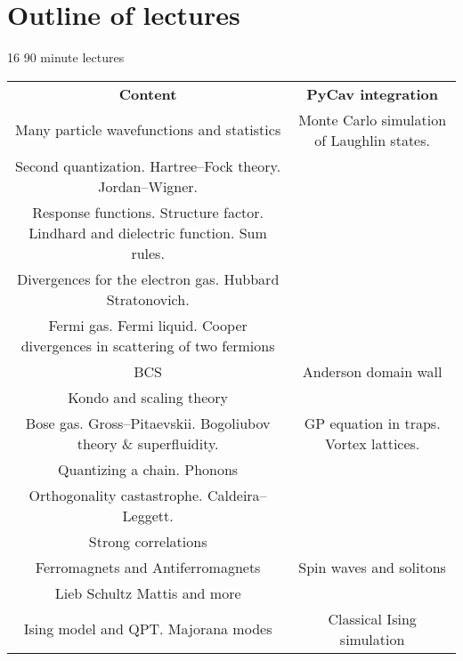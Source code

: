 \section{Outline of lectures}

16 90 minute lectures

\begin{table} 
    \begin{tabular}{ c | c }
     \textbf{Content}   & \textbf{PyCav integration}  \\ 
       Many particle wavefunctions and statistics 
   & Monte Carlo simulation of Laughlin states. \\ 
      Second quantization. Hartree--Fock theory. Jordan--Wigner.  &  \\ 
      Response functions. Structure factor. Lindhard and dielectric function. Sum rules.     &  \\ 
        Divergences for the electron gas. Hubbard Stratonovich. & \\
      Fermi gas. Fermi liquid. Cooper divergences in scattering of two fermions  &  \\ 
      BCS   & Anderson domain wall  \\ 
      Kondo and scaling theory   &  \\ 
      Bose gas. Gross--Pitaevskii. Bogoliubov theory \& superfluidity.   & GP equation in traps. Vortex lattices. \\ 
      Quantizing a chain. Phonons   &  \\ 
      Orthogonality castastrophe. Caldeira--Leggett.   &  \\ 
      Strong correlations   &  \\ 
      Ferromagnets and Antiferromagnets   & Spin waves and solitons \\ 
      Lieb Schultz Mattis and more \\
    Ising model and QPT. Majorana modes   &  Classical Ising simulation \\ 


    \end{tabular} 
\end{table}

